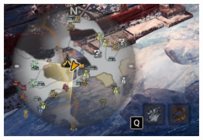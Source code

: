 \documentclass[12pt]{article}
\begin{document}
\begin{description}
    \begin{center}
        \includegraphics[width=0.8\textwidth]{Image/HUD_Details/Minimap.png}
    \end{center}
\end{description}
\end{document}
